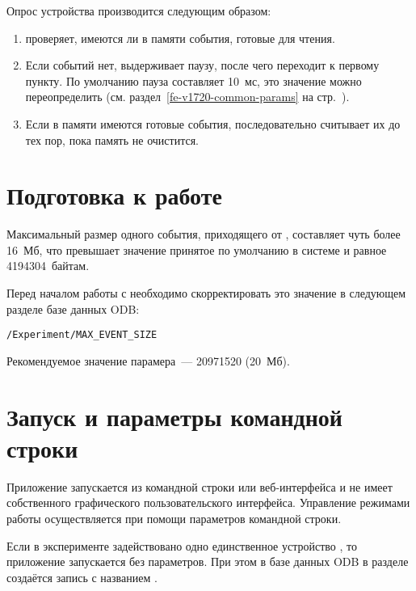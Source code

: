 Опрос устройства производится следующим образом:

\begin{enumerate}

\item 
\label{item-fe-v1720-poll-check}
 проверяет, имеются ли в памяти \DEVICE{} события, готовые для чтения.

\item Если событий нет,  выдерживает паузу, после чего переходит к первому пункту. По умолчанию пауза составляет 10~мс, это значение можно переопределить (см. раздел~\ref{fe-v1720-common-params} на стр.~\pageref{fe-v1720-common-params}).

\item Если в памяти \DEVICE{} имеются готовые события,  последовательно считывает их до тех пор, пока память не очистится.

\end{enumerate}

\section{Подготовка к работе}

Максимальный размер одного события, приходящего от \DEVICE{}, составляет чуть более 16~Мб, что превышает значение принятое по умолчанию в системе \MIDAS{} и равное 4194304~байтам.

Перед началом работы с  необходимо скорректировать это значение в следующем разделе базе данных ODB:

\medskip
{\tt /Experiment/MAX\_EVENT\_SIZE}
\medskip

Рекомендуемое значение парамера~--- 20971520 (20~Мб).

\section{Запуск и параметры командной строки}

Приложение  запускается из командной строки или веб-ин\-тер\-фейса \MIDAS{} \cite{MidasWikiMhttpd} и не имеет собственного графического пользовательского интерфейса. Управление режимами работы осуществляется при помощи параметров командной строки.

Если в эксперименте задействовано одно единственное устройство \DEVICE{}, то приложение  запускается без параметров. При этом в базе данных ODB в разделе  \cite{MidasWikiEquipment} создаётся запись с названием .

